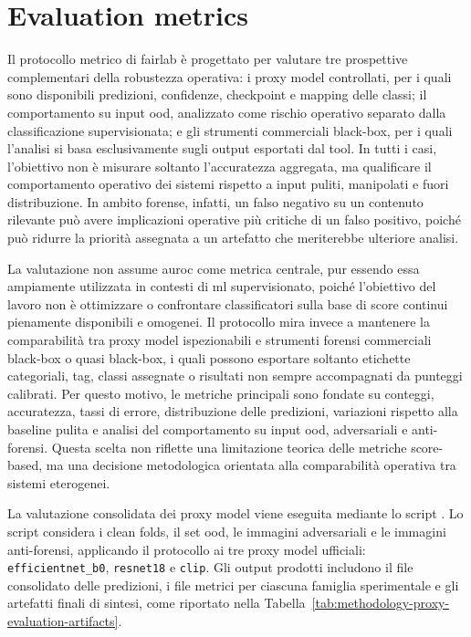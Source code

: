 \section{Evaluation metrics}
\label{sec:methodology-evaluation-metrics}

Il protocollo metrico di \gls{fairlab} è progettato per valutare tre
prospettive complementari della robustezza operativa: i proxy model
controllati, per i quali sono disponibili predizioni, confidenze, checkpoint e
mapping delle classi; il comportamento su input \gls{ood}, analizzato come
rischio operativo separato dalla classificazione supervisionata; e gli strumenti
commerciali black-box, per i quali l'analisi si basa esclusivamente sugli
output esportati dal tool. In tutti i casi, l'obiettivo non è misurare soltanto
l'accuratezza aggregata, ma qualificare il comportamento operativo dei sistemi
rispetto a input puliti, manipolati e fuori distribuzione. In ambito forense,
infatti, un falso negativo su un contenuto rilevante può avere implicazioni
operative più critiche di un falso positivo, poiché può ridurre la priorità
assegnata a un artefatto che meriterebbe ulteriore analisi.


La valutazione non assume \gls{auroc} come metrica centrale, pur essendo essa
ampiamente utilizzata in contesti di \gls{ml} supervisionato, poiché l'obiettivo
del lavoro non è ottimizzare o confrontare classificatori sulla base di score
continui pienamente disponibili e omogenei. Il protocollo mira invece a
mantenere la comparabilità tra proxy model ispezionabili e strumenti forensi
commerciali black-box o quasi black-box, i quali possono esportare soltanto
etichette categoriali, tag, classi assegnate o risultati non sempre accompagnati
da punteggi calibrati. Per questo motivo, le metriche principali sono fondate
su conteggi, accuratezza, tassi di errore, distribuzione delle predizioni,
variazioni rispetto alla baseline pulita e analisi del comportamento su input
\gls{ood}, adversariali e anti-forensi. Questa scelta non riflette una
limitazione teorica delle metriche score-based, ma una decisione metodologica
orientata alla comparabilità operativa tra sistemi eterogenei.

La valutazione consolidata dei proxy model viene eseguita mediante lo script
. Lo script considera
i clean folds, il set \gls{ood}, le immagini adversariali e le immagini
anti-forensi, applicando il protocollo ai tre proxy model ufficiali:
\texttt{efficientnet\_b0}, \texttt{resnet18} e \texttt{clip}. Gli output
prodotti includono il file consolidato delle predizioni, i file metrici per
ciascuna famiglia sperimentale e gli artefatti finali di sintesi, come riportato
nella Tabella~\ref{tab:methodology-proxy-evaluation-artifacts}.

